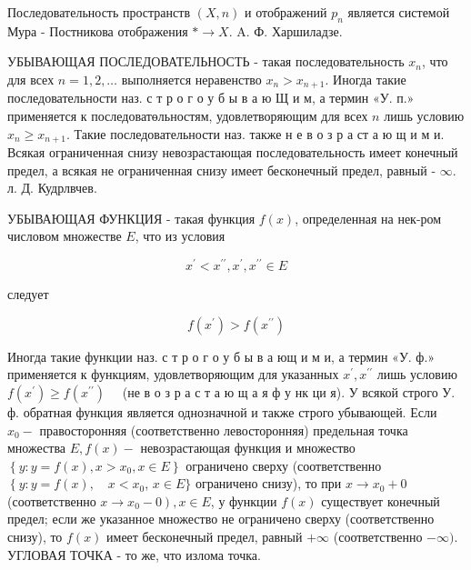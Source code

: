 \documentclass[10pt]{article}
\begin{document}
Последовательность пространств $(X, n)$ и отображений $p_{n}$ является системой Мура - Постникова отображения $* \rightarrow X$. A. Ф. Харшиладзе.



УБЫВАЮЩАЯ ПОСЛЕДОВАТЕЛЬНОСТЬ - такая последовательность $x_{n}$, что для всех $n=1,2, \ldots$ выполняется неравенство $x_{n}>x_{n+1}$. Иногда такие последовательности наз. с т р о г о у б ы в а ю Щ и м, а термин «У. п.» применяется к последоватөльностям, удовлетворяющим для всех $n$ лишь условию $x_{n} \geqslant x_{n+1}$. Такие последовательности наз. также н е в о з р а ст а ю щ и м и. Всякая ограниченная снизу невозрастающая последовательность имеет конечный предел, а всякая не ограниченная снизу имеет бесконечный предел, равный - $\infty$. л. Д. Кудрлвчев.



УБЫВАЮЩАЯ ФУНКЦИЯ - такая функция $f(x)$, определенная на нек-ром числовом множестве $E$, что из условия



\[

x^{\prime}<x^{\prime \prime}, x^{\prime}, x^{\prime \prime} \in E

\]



следует



\[

f\left(x^{\prime}\right)>f\left(x^{\prime \prime}\right)

\]



Иногда такие функции наз. с т р о г о у б ы в а ющ и м и, а термин «У. ф.» применяется к функциям, удовлетворяющим для указанных $x^{\prime}, x^{\prime \prime}$ лишь условию $f\left(x^{\prime}\right) \geqslant f\left(x^{\prime \prime}\right) \quad$ (не в о з р а с т а ю щ а я ф у нк ци я). У всякой строго У. ф. обратная функция является однозначной и также строго убывающей. Если $x_{0}-$ правосторонняя (соответственно левосторонняя) предельная точка множества $E, f(x)-$ невозрастающая функция и множество $\left\{y: y=f(x), x>x_{0}, x \in E\right\}$ ограничено сверху (соответственно $\left\{y: y=f(x), \quad x<x_{0}\right.$, $x \in E\}$ ограничено снизу), то при $x \rightarrow x_{0}+0$ (соответственно $\left.x \rightarrow x_{0}-0\right), x \in E$, у функции $f(x)$ существует конечный предел; если же указанное множество не ограничено сверху (соответственно снизу), то $f(x)$ имеет бесконечный предел, равный $+\infty$ (соответственно $-\infty)$. УГЛОВАЯ ТОЧКА - то же, что излома точка.
\end{document}

